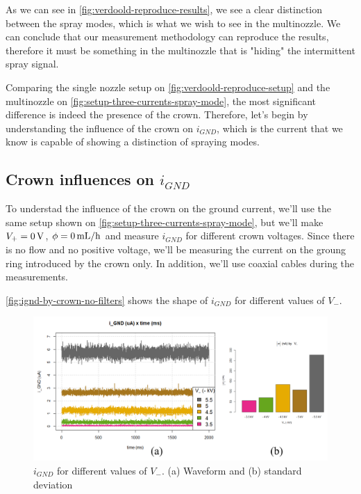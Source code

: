 \documentclass[oneside,12pt]{article}
\begin{document}
As we can see in \autoref{fig:verdoold-reproduce-results}, we see a clear distinction between the spray modes, 
which is what we wish to see in the multinozzle. We can conclude that our measurement methodology can 
reproduce the results, therefore it must be something in the multinozzle that is "hiding" the intermittent spray 
signal.

Comparing the single nozzle setup on \autoref{fig:verdoold-reproduce-setup} and the multinozzle on \autoref{fig:setup-three-currents-spray-mode}, 
the most significant difference is indeed the presence of the crown. Therefore, let's begin by understanding the influence 
of the crown on $i_{GND}$, which is the current that we know is capable of showing a distinction of spraying 
modes. 

\subsection{Crown influences on $i_{GND}$}

To understad the influence of the crown on the ground current, we'll use the same setup shown on 
\autoref{fig:setup-three-currents-spray-mode}, but we'll make $V_+ = 0 \,\mathrm{V}$, $\phi = 0 \,\mathrm{mL / h}$ and measure $i_{GND}$ for different
crown voltages. Since there is no flow 
and no positive voltage, we'll be measuring the current on the groung ring introduced by the crown only.
In addition, we'll use coaxial cables during the measurements.

\autoref{fig:ignd-by-crown-no-filters} shows the shape of $i_{GND}$ for different values of $V_-$.

\begin{figure}[h!]
    \centering
    \includegraphics[width=1\textwidth,trim=1 1 1 1,clip]{figures/ignd-by-crown-no-filters.png}
    \caption{$i_{GND}$ for different values of $V_-$. (a) Waveform and (b) standard deviation}
    \label{fig:ignd-by-crown-no-filters}
\end{figure}
\end{document}
